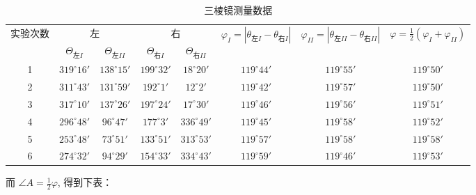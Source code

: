 \documentclass[10pt,a4paper]{ctexart}
\begin{document}
        \begin{table}[htbp]
            \centering
            \caption{三棱镜测量数据}
            \label{tab:bridge_custom}
            \begin{tabular}{cccccccc}
                \toprule
                \multirow{2}{*}{实验次数} & \multicolumn{2}{c}{左} & \multicolumn{2}{c}{右} & \multirow{2}{*}{$\varphi_I = |\theta_{\text{左}I} - \theta_{\text{右}I}|$} &  \multirow{2}{*}{$\varphi_{II} = |\theta_{\text{左}II} - \theta_{\text{右}II}|$} & \multirow{2}{*}{$\varphi = \frac{1}{2}(\varphi_I + \varphi_{II})$} \\
                \cmidrule(lr){2-3} \cmidrule(lr){4-5}

                & \multicolumn{1}{c|}{$\Theta_{\text{左}I}$} & $\Theta_{\text{左}II}$ & \multicolumn{1}{c|}{$\Theta_{\text{右}I}$} & $\Theta_{\text{右}II}$ & & & \\ 

                 \midrule
                1 & $319^\circ 16'$ & $138^\circ 15'$ & $199^\circ 32'$ & $18^\circ 20'$ & $119^\circ 44'$ & $119^\circ 55'$ & $119^\circ 50'$ \\
                2 & $311^\circ 43'$ & $131^\circ 59'$ & $192^\circ 1'$ & $12^\circ 2'$ & $119^\circ 42'$ & $119^\circ 57'$ & $119^\circ 50'$ \\            
                3 & $317^\circ 10'$ & $137^\circ 26'$ & $197^\circ 24'$ & $17^\circ 30'$ & $119^\circ 46'$ & $119^\circ 56'$ & $119^\circ 51'$ \\
                4 & $296^\circ 48'$ & $96^\circ 47'$ & $177^\circ 3'$ & $336^\circ 49'$ & $119^\circ 45'$ & $119^\circ 58'$ & $119^\circ 52'$ \\
                5 & $253^\circ 48'$ & $73^\circ 51'$ & $133^\circ 51'$ & $313^\circ 53'$ & $119^\circ 57'$ & $119^\circ 58'$ & $119^\circ 58'$ \\
                6 & $274^\circ 32'$ & $94^\circ 29'$ & $154^\circ 33'$ & $334^\circ 43'$ & $119^\circ 59'$ & $119^\circ 46'$ & $119^\circ 53'$ \\
                \bottomrule
            \end{tabular}
        \end{table}

        而 $ \angle A = \frac{1}{2} \varphi $, 得到下表：
\end{document}

